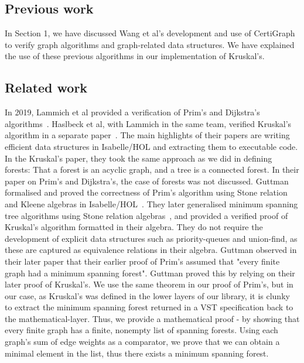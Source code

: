 \subsection{Previous work}

In Section 1, we have discussed Wang et al's development and use of CertiGraph to verify graph algorithms and graph-related data structures. We have explained the use of these previous algorithms in our implementation of Kruskal's.

\subsection{Related work}
In 2019, Lammich et al provided a verification of Prim's and Dijkstra's algorithms~\cite{DBLP:journals/afp/LammichN19}. Haslbeck et al, with Lammich in the same team, verified Kruskal's algorithm in a separate paper~\cite{DBLP:journals/afp/HaslbeckLB19}. The main highlights of their papers are writing efficient data structures in Isabelle/HOL and extracting them to executable code. In the Kruskal's paper, they took the same approach as we did in defining forests: That a forest is an acyclic graph, and a tree is a connected forest. In their paper on Prim's and Dijkstra's, the case of forests was not discussed.
\newline\newline
Guttman formalised and proved the correctness of Prim's algorithm using Stone relation and Kleene algebras in Isabelle/HOL~\cite{DBLP:conf/ictac/Guttmann16}. They later generalised minimum spanning tree algorithms using Stone relation algebras~\cite{DBLP:journals/jlp/Guttmann18}, and provided a verified proof of Kruskal's algorithm formatted in their algebra. They do not require the development of explicit data structures such as priority-queues and union-find, as these are captured as equivalence relations in their algebra.
\newline\newline
Guttman observed in their later paper that their earlier proof of Prim's assumed that "every finite graph had a minimum spanning forest". Guttman proved this by relying on their later proof of Kruskal's. We use the same theorem in our proof of Prim's, but in our case, as Kruskal's was defined in the lower layers of our library, it is clunky to extract the minimum spanning forest returned in a VST specification back to the mathematical-layer. Thus, we provide a mathematical proof - by showing that every finite graph has a finite, nonempty list of spanning forests. Using each graph's sum of edge weights as a comparator, we prove that we can obtain a minimal element in the list, thus there exists a minimum spanning forest.
